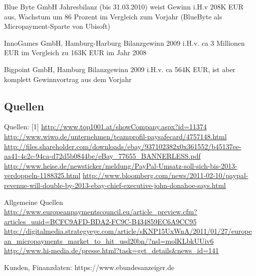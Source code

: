 Blue Byte GmbH\newline \newline
Jahresbilanz (bis 31.03.2010) weist Gewinn i.H.v 208K EUR aus, Wachstum um 86
Prozent im Vergleich zum Vorjahr  (BlueByte als Micropayment-Sparte von
Ubisoft)\newline 

InnoGames GmbH, Hamburg-Harburg\newline \newline
Bilanzgewinn 2009 i.H.v. ca 3 Millionen EUR im Vergleich zu 163K EUR im Jahr
2008\newline 

Bigpoint GmbH, Hamburg\newline \newline
Bilanzgewinn 2009 i.H.v. ca 564K EUR, ist aber komplett Gewinnvortrag aus dem
Vorjahr\newline
  
\subsection{Quellen}
Quellen:
[1] \url{http://www.top1001.at/showCompany.aspx?id=11374} \newline
[2] \url{http://www.wiwo.de/unternehmen/teamprofil-paysafecard/4757148.html} \newline
[3] \url{http://files.shareholder.com/downloads/ebay/937102382x0x361552/b45137ee-aa41-4c2c-94ca-d72d5b0844be/eBay_77655_BANNERLESS.pdf} \newline 
[4] \url{http://www.heise.de/newsticker/meldung/PayPal-Umsatz-soll-sich-bis-2013-verdoppeln-1188325.html} \newline
[5] \url{http://www.bloomberg.com/news/2011-02-10/paypal-revenue-will-double-by-2013-ebay-chief-executive-john-donahoe-says.html} \newline


Allgemeine Quellen \newline \newline
[A1] \url{http://www.europeanpaymentscouncil.eu/article_preview.cfm?articles_uuid=BCFC9AFD-BDA2-FC9C-B434859EC6A9CC95}
\newline 
[A2] \url{http://digitalmedia.strategyeye.com/article/sKNP15UxWnA/2011/01/27/european_micropayments_market_to_hit_usd20bn/?nsl=molKLbkUUiv6} \newline
[A3] \url{http://www.hi-media.de/presse.html?task=get_details&news_id=141} \newline

Kunden, Finanzdaten: \newline \newline 
[K1]  https://www.ebundesanzeiger.de

